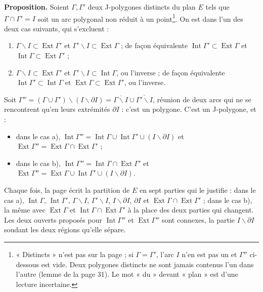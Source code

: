 \documentclass[11pt,a4paper]{article}
\begin{document}
\textbf{Proposition.} Soient $\Gamma, \Gamma'$ deux J-polygones distincts du
plan $E$ tels que $\Gamma \cap \Gamma' = I$ soit un arc polygonal non réduit à
un point\footnote{« Distincts » n'est pas sur la page ; si $\Gamma = \Gamma'$,
l'arc $I$ n'en est pas un et $\Gamma''$ ci-dessous est vide. Deux polygones
distincts ne sont jamais contenus l'un dans l'autre (lemme de la page 31). Le
mot « du » devant « plan » est d'une lecture incertaine.}. On est dans l'un
des deux cas suivants, qui s'excluent :
\begin{enumerate}
  \item[a)] $\Gamma \smallsetminus I \subset \operatorname{Ext}\Gamma'$ et
    $\Gamma' \smallsetminus I \subset \operatorname{Ext}\Gamma$ ; de façon
    équivalente $\operatorname{Int}\Gamma' \subset \operatorname{Ext}\Gamma$ et
    $\operatorname{Int}\Gamma \subset \operatorname{Ext}\Gamma'$ ;
  \item[b)] $\Gamma \smallsetminus I \subset \operatorname{Ext}\Gamma'$ et
    $\Gamma' \smallsetminus I \subset \operatorname{Int}\Gamma$, ou l'inverse ;
    de façon équivalente $\operatorname{Int}\Gamma' \subset
    \operatorname{Int}\Gamma$ et $\operatorname{Ext}\Gamma \subset
    \operatorname{Ext}\Gamma'$, ou l'inverse.
\end{enumerate}
Soit $\Gamma'' = (\Gamma \cup \Gamma') \smallsetminus (I \smallsetminus
\partial I) = \overline{\Gamma \smallsetminus I} \cup \overline{\Gamma'
\smallsetminus I}$, réunion de deux arcs qui ne se rencontrent qu'en leurs
extrémités $\partial I$ : c'est un polygone. C'est un J-polygone, et :
\begin{itemize}
  \item dans le cas a), $\operatorname{Int}\Gamma'' = \operatorname{Int}\Gamma
    \cup \operatorname{Int}\Gamma' \cup (I \smallsetminus \partial I)$ et
    $\operatorname{Ext}\Gamma'' = \operatorname{Ext}\Gamma \cap
    \operatorname{Ext}\Gamma'$ ;
  \item dans le cas b), $\operatorname{Int}\Gamma'' = \operatorname{Int}\Gamma
    \cap \operatorname{Ext}\Gamma'$ et $\operatorname{Ext}\Gamma'' =
    \operatorname{Ext}\Gamma \cup \operatorname{Int}\Gamma' \cup (I
    \smallsetminus \partial I)$.
\end{itemize}
Chaque fois, la page écrit la partition de $E$ en sept parties qui le
justifie : dans le cas a), $\operatorname{Int}\Gamma$,
$\operatorname{Int}\Gamma'$, $\Gamma \smallsetminus I$, $\Gamma'
\smallsetminus I$, $I \smallsetminus \partial I$, $\partial I$ et
$\operatorname{Ext}\Gamma \cap \operatorname{Ext}\Gamma'$ ; dans le cas b), la
même avec $\operatorname{Ext}\Gamma$ et $\operatorname{Int}\Gamma \cap
\operatorname{Ext}\Gamma'$ à la place des deux parties qui changent. Les deux
ouverts proposés pour $\operatorname{Int}\Gamma''$ et
$\operatorname{Ext}\Gamma''$ sont connexes, la partie $I \smallsetminus
\partial I$ soudant les deux régions qu'elle sépare.
\end{document}
